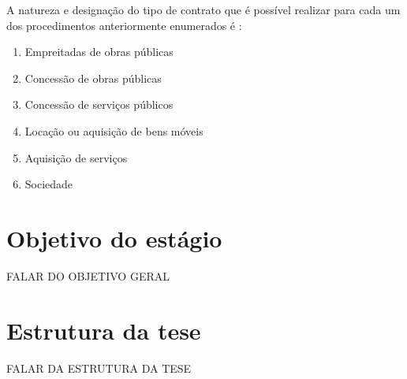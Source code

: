 
A natureza e designação do tipo de contrato que é possível realizar para cada um dos procedimentos anteriormente enumerados é : 

\begin{enumerate}
	\setlength\itemsep{.01cm}
	\item Empreitadas de obras públicas
	\item Concessão de obras públicas
	\item Concessão de serviços públicos
	\item Locação ou aquisição de bens móveis
	\item Aquisição de serviços
	\item Sociedade
\end{enumerate}


\section{Objetivo do estágio}

FALAR DO OBJETIVO GERAL 
\\

\section{Estrutura da tese}
FALAR DA ESTRUTURA DA TESE\\



